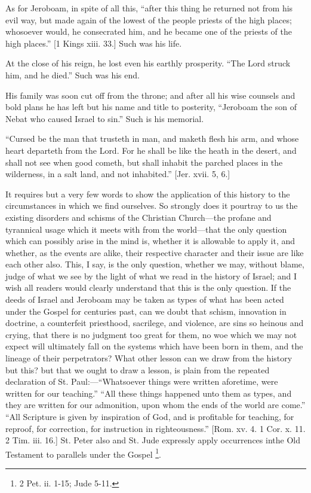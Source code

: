As for Jeroboam, in spite of all this, ``after this thing he
returned not from his evil way, but made again of the lowest of the
people priests of the high places; whosoever would, he consecrated
him, and he became one of the priests of the high places.'' [1
Kings xiii. 33.] Such was his life.

At the close of his reign, he lost even his earthly prosperity.
``The Lord struck him, and he died.'' Such was his end.

His family was soon cut off from the throne; and after all his wise
counsels and bold plans he has left but his name and title to
posterity, ``Jeroboam the son of Nebat who caused Israel to
sin.'' Such is his memorial.

``Cursed be the man that trusteth in man, and maketh flesh his
arm, and whose heart departeth from the Lord. For he shall be like the
heath in the desert, and shall not see when good cometh, but shall
inhabit the parched places in the wilderness, in a salt land, and not
inhabited.'' [Jer. xvii. 5, 6.]

It requires but a very few words to show the application of this
history to the circumstances in which we find ourselves. So strongly
does it pourtray to us the existing disorders and schisms of the
Christian Church—the profane and tyrannical usage which it meets
with from the world—that the only question which can possibly arise
in the mind is, whether it is allowable to apply it, and whether, as
the events are alike, their respective character and their issue are
like each other also. This, I say, is the only question, whether we
may, without blame, judge of what we see by the light of what we read
in the history of Israel; and I wish all readers would clearly
understand that this is the only question. If the deeds of Israel and
Jeroboam may be taken as types of what has been acted under the Gospel
for centuries past, can we doubt that schism, innovation in doctrine,
a counterfeit priesthood, sacrilege, and violence, are sins so heinous
and crying, that there is no judgment too great for them, no woe which
we may not expect will ultimately fall on the systems which have been
born in them, and the lineage of their perpetrators? What other lesson
can we draw from the history but this? but that we ought to draw a
lesson, is plain from the repeated declaration of St. Paul:—``Whatsoever
things were written aforetime, were written for our teaching.''
``All these things happened unto them as types, and they are
written for our admonition, upon whom the ends of the world are
come.'' ``All Scripture is given by inspiration of God, and is
profitable for teaching, for reproof, for correction, for instruction
in righteousness.'' [Rom. xv. 4. 1 Cor. x. 11. 2 Tim. iii. 16.]
St. Peter also and St. Jude expressly apply occurrences in\textbf{}the
Old Testament to parallels under the Gospel \footnote{2 Pet. ii.
1-15; Jude 5-11.}.

